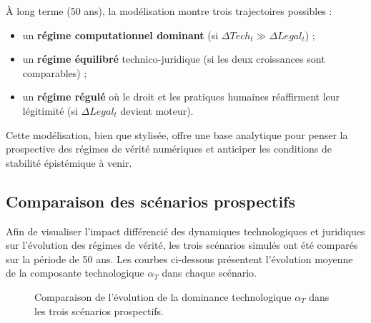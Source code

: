 \documentclass[12pt, a4em]{article}
\begin{document}
	À long terme (50 ans), la modélisation montre trois trajectoires possibles :
	\begin{itemize}
		\item un \textbf{régime computationnel dominant} (si $\Delta Tech_t \gg \Delta Legal_t$) ;
		\item un \textbf{régime équilibré} technico-juridique (si les deux croissances sont comparables) ;
		\item un \textbf{régime régulé} où le droit et les pratiques humaines réaffirment leur légitimité (si $\Delta Legal_t$ devient moteur).
	\end{itemize}
	
	Cette modélisation, bien que stylisée, offre une base analytique pour penser la prospective des régimes de vérité numériques et anticiper les conditions de stabilité épistémique à venir.
	
	\subsection{ Comparaison des scénarios prospectifs}
	
	Afin de visualiser l’impact différencié des dynamiques technologiques et juridiques sur
	l’évolution des régimes de vérité, les trois scénarios simulés ont été comparés sur la période
	de 50 ans. Les courbes ci-dessous présentent l’évolution moyenne de la composante
	technologique $\alpha_T$ dans chaque scénario.
	
	\begin{figure}[h!]
		\centering
		\caption{Comparaison de l’évolution de la dominance technologique $\alpha_T$ dans les trois scénarios prospectifs.}
	\end{figure}
	
\end{document}

